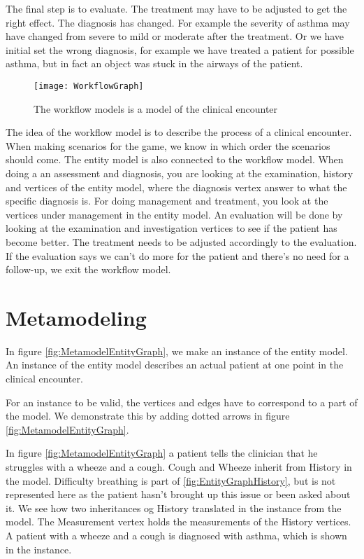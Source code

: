 The final step is to evaluate. The treatment may have to be adjusted to get the right effect. The diagnosis has changed. For example the severity of asthma may have changed from severe to mild or moderate after the treatment. Or we have initial set the wrong diagnosis, for example we have treated a patient for possible asthma, but in fact an object was stuck in the airways of the patient.


\begin{figure}[h!]
	\texttt{[image: WorkflowGraph]}
	\caption {The workflow models is a model of the clinical encounter}
		\label{fig:WorkflowGraph}
\end{figure}

The idea of the workflow model is to describe the process of a clinical encounter. When making scenarios for the game, we know in which order the scenarios should come. The entity model is also connected to the workflow model. When doing a an assessment and diagnosis, you are looking at the examination, history and vertices of the entity model, where the diagnosis vertex answer to what the specific diagnosis is. For doing management and treatment, you look at the vertices under management in the entity model. An evaluation will be done by looking at the examination and investigation vertices to see if the patient has become better. The treatment needs to be adjusted accordingly to the evaluation. If the evaluation says we can't do more for the patient and there's no need for a follow-up, we exit the workflow model.


\section{Metamodeling}


In figure \ref{fig:MetamodelEntityGraph}, we make an instance of the entity model. An instance of the entity model describes an actual patient at one point in the clinical encounter. 

For an instance to be valid, the vertices and edges have to correspond to a part of the model. We demonstrate this by adding dotted arrows in figure \ref{fig:MetamodelEntityGraph}. 

In figure \ref{fig:MetamodelEntityGraph} a patient tells the clinician that he struggles with a wheeze and a cough. Cough and Wheeze inherit from History in the model. Difficulty breathing is part of \ref{fig:EntityGraphHistory}, but is not represented here as the patient hasn't brought up this issue or been asked about it. We see how two inheritances og History translated in the instance from the model. The Measurement vertex holds the measurements of the History vertices. A patient with a wheeze and a cough is diagnosed with asthma, which is shown in the instance.

